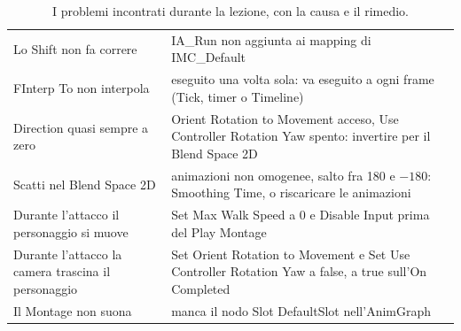 \begin{table}[htbp]
\begin{tabular}{@{}p{5.4cm}p{8.6cm}@{}}
Lo Shift non fa correre & IA\_Run non aggiunta ai mapping di IMC\_Default \\
FInterp To non interpola & eseguito una volta sola: va eseguito a ogni frame (Tick,
timer o Timeline) \\
Direction quasi sempre a zero & Orient Rotation to Movement acceso, Use Controller
Rotation Yaw spento: invertire per il Blend Space 2D \\
Scatti nel Blend Space 2D & animazioni non omogenee, salto fra 180 e $-180$: Smoothing
Time, o riscaricare le animazioni \\
Durante l'attacco il personaggio si muove & Set Max Walk Speed a 0 e Disable Input prima
del Play Montage \\
Durante l'attacco la camera trascina il personaggio & Set Orient Rotation to Movement e
Set Use Controller Rotation Yaw a false, a true sull'On Completed \\
Il Montage non suona & manca il nodo Slot DefaultSlot nell'AnimGraph \\
\bottomrule
\end{tabular}
\caption{I problemi incontrati durante la lezione, con la causa e il rimedio.}
\label{ue9:tab:errori}
\end{table}

